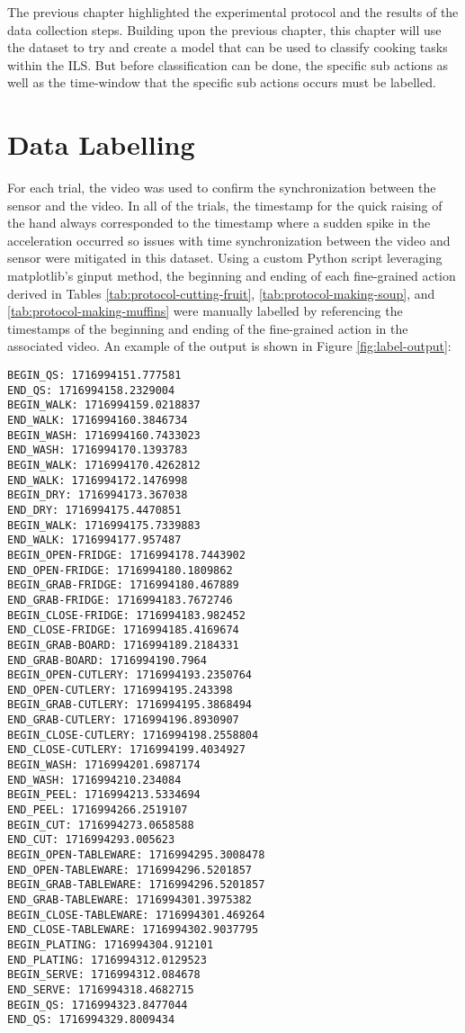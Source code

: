 

The previous chapter highlighted the experimental protocol and the results of the data collection steps. Building upon the previous chapter, this chapter will use the dataset to try and create a model that can be used to classify cooking tasks within the ILS. But before classification can be done, the specific sub actions as well as the time-window that the specific sub actions occurs must be labelled. 

\section{Data Labelling}
For each trial, the video was used to confirm the synchronization between the sensor and the video. In all of the trials, the timestamp for the quick raising of the hand always corresponded to the timestamp where a sudden spike in the acceleration occurred so issues with time synchronization between the video and sensor were mitigated in this dataset. Using a custom Python script leveraging matplotlib's ginput method, the beginning and ending of each fine-grained action derived in Tables \ref{tab:protocol-cutting-fruit}, \ref{tab:protocol-making-soup}, and \ref{tab:protocol-making-muffins} were manually labelled by referencing the timestamps of the beginning and ending of the fine-grained action in the associated video. An example of the output is shown in Figure \ref{fig:label-output}:

\begin{lstlisting}[label=fig:label-output, caption=Manual labelling output]
BEGIN_QS: 1716994151.777581
END_QS: 1716994158.2329004
BEGIN_WALK: 1716994159.0218837
END_WALK: 1716994160.3846734
BEGIN_WASH: 1716994160.7433023
END_WASH: 1716994170.1393783
BEGIN_WALK: 1716994170.4262812
END_WALK: 1716994172.1476998
BEGIN_DRY: 1716994173.367038
END_DRY: 1716994175.4470851
BEGIN_WALK: 1716994175.7339883
END_WALK: 1716994177.957487
BEGIN_OPEN-FRIDGE: 1716994178.7443902
END_OPEN-FRIDGE: 1716994180.1809862
BEGIN_GRAB-FRIDGE: 1716994180.467889
END_GRAB-FRIDGE: 1716994183.7672746
BEGIN_CLOSE-FRIDGE: 1716994183.982452
END_CLOSE-FRIDGE: 1716994185.4169674
BEGIN_GRAB-BOARD: 1716994189.2184331
END_GRAB-BOARD: 1716994190.7964
BEGIN_OPEN-CUTLERY: 1716994193.2350764
END_OPEN-CUTLERY: 1716994195.243398
BEGIN_GRAB-CUTLERY: 1716994195.3868494
END_GRAB-CUTLERY: 1716994196.8930907
BEGIN_CLOSE-CUTLERY: 1716994198.2558804
END_CLOSE-CUTLERY: 1716994199.4034927
BEGIN_WASH: 1716994201.6987174
END_WASH: 1716994210.234084
BEGIN_PEEL: 1716994213.5334694
END_PEEL: 1716994266.2519107
BEGIN_CUT: 1716994273.0658588
END_CUT: 1716994293.005623
BEGIN_OPEN-TABLEWARE: 1716994295.3008478
END_OPEN-TABLEWARE: 1716994296.5201857
BEGIN_GRAB-TABLEWARE: 1716994296.5201857
END_GRAB-TABLEWARE: 1716994301.3975382
BEGIN_CLOSE-TABLEWARE: 1716994301.469264
END_CLOSE-TABLEWARE: 1716994302.9037795
BEGIN_PLATING: 1716994304.912101
END_PLATING: 1716994312.0129523
BEGIN_SERVE: 1716994312.084678
END_SERVE: 1716994318.4682715
BEGIN_QS: 1716994323.8477044
END_QS: 1716994329.8009434
\end{lstlisting}